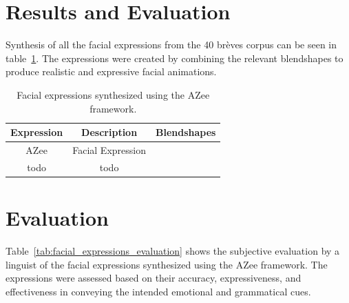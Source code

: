 \documentclass[../../main]{subfiles}
\begin{document}

\section{Results and Evaluation}
\label{ch:facial_expressions:results}

Synthesis of all the facial expressions from the 40 brèves corpus can be seen in table~\ref{tab:facial_expressions}. The expressions were created by combining the relevant blendshapes to produce realistic and expressive facial animations.

\begin{table}
    \centering
    \begin{tabular}{|c|c|c|}
        \hline
        \textbf{Expression} & \textbf{Description} & \textbf{Blendshapes} \\
        \hline
        AZee & Facial Expression \\
        todo & todo \\
    \end{tabular}
    \caption{Facial expressions synthesized using the AZee framework.}
    \label{tab:facial_expressions}
\end{table}

\section{Evaluation}
\label{ch:facial_expressions:evaluation}

Table~\ref{tab:facial_expressions_evaluation} shows the subjective evaluation by a linguist of the facial expressions synthesized using the AZee framework. The expressions were assessed based on their accuracy, expressiveness, and effectiveness in conveying the intended emotional and grammatical cues.
\end{document}
